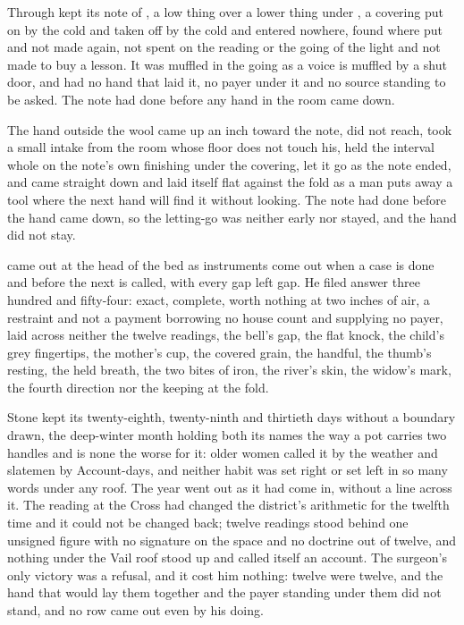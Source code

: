 Through   kept its note of , a low thing over a lower thing under , a covering put on by the cold and taken off by the cold and entered nowhere, found where put and not made again, not spent on the reading or the going of the light and not made to buy a lesson. It was muffled in the going as a voice is muffled by a shut door, and had no hand that laid it, no payer under it and no source standing to be asked. The note had done before any hand in the room came down.

The hand outside the wool came up an inch toward the note, did not reach, took a small intake from the room whose floor does not touch his, held the interval whole on the note's own finishing under the covering, let it go as the note ended, and came straight down and laid itself flat against the fold as a man puts away a tool where the next hand will find it without looking. The note had done before the hand came down, so the letting-go was neither early nor stayed, and the hand did not stay.

 came out at the head of the bed as instruments come out when a case is done and before the next is called, with every gap left gap. He filed answer three hundred and fifty-four: exact, complete, worth nothing at two inches of air, a restraint and not a payment borrowing no house count and supplying no payer, laid across neither the twelve readings, the bell's gap, the flat knock, the child's grey fingertips, the mother's cup, the covered grain, the handful, the thumb's resting, the held breath, the two bites of iron, the river's skin, the widow's mark, the fourth direction nor the keeping at the fold.

\scenebreak

Stone kept its twenty-eighth, twenty-ninth and thirtieth days without a boundary drawn, the deep-winter month holding both its names the way a pot carries two handles and is none the worse for it: older women called it by the weather and slatemen by  Account-days, and neither habit was set right or set left in so many words under any roof. The year went out as it had come in, without a line across it. The reading at the Cross had changed the district's arithmetic for the twelfth time and it could not be changed back; twelve readings stood behind one unsigned figure with no signature on the space and no doctrine out of twelve, and nothing under the Vail roof stood up and called itself an account. The surgeon's only victory was a refusal, and it cost him nothing: twelve were twelve, and the hand that would lay them together and the payer standing under them did not stand, and no row came out even by his doing.

